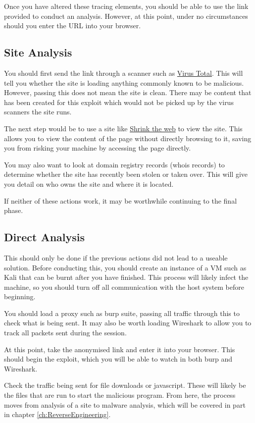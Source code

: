 			Once you have altered these tracing elements, you should be able to use the link provided to conduct an analysis. 
			However, at this point, under no circumstances should you enter the URL into your browser. 

		\subsection{Site Analysis}
			You should first send the link through a scanner such as \href{virustotal.com}{Virus Total}. 
			This will tell you whether the site is loading anything commonly known to be malicious. 
			However, passing this does not mean the site is clean. 
			There may be content that has been created for this exploit which would not be picked up by the virus scanners the site runs. 

			The next step would be to use a site like \href{shrinktheweb.com}{Shrink the web} to view the site. 
			This allows you to view the content of the page without directly browsing to it, 
			saving you from risking your machine by accessing the page directly. 

			You may also want to look at domain registry records (whois records) to determine whether the site has recently been stolen or taken over. 
			This will give you detail on who owns the site and where it is located. 

			If neither of these actions work, it may be worthwhile continuing to the final phase. 

		\subsection{Direct Analysis}
			This should only be done if the previous actions did not lead to a useable solution. 
			Before conducting this, you should create an instance of a VM such as Kali that can be burnt after you have finished. 
			This process will likely infect the machine, so you should turn off all communication with the host system before beginning. 

			You should load a proxy such as burp suite, passing all traffic through this to check what is being sent. 
			It may also be worth loading Wireshark to allow you to track all packets sent during the session. 

			At this point, take the anonymised link and enter it into your browser. 
			This should begin the exploit, which you will be able to watch in both burp and Wireshark. 

			Check the traffic being sent for file downloads or javascript. 
			These will likely be the files that are run to start the malicious program. 
			From here, the process moves from analysis of a site to malware analysis, which will be covered in part in chapter \ref{ch:ReverseEngineering}.
